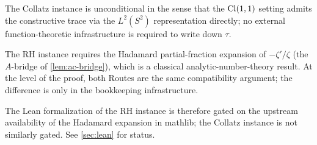 \begin{remark}
\label{rmk:collatz-unconditional}
The Collatz instance is unconditional in the sense that the
$\mathrm{Cl}(1,1)$ setting admits the constructive trace via the
$L^2(S^2)$ representation directly; no external function-theoretic
infrastructure is required to write down $\tau$.

The RH instance requires the Hadamard partial-fraction expansion
of $-\zeta'/\zeta$ (the $A$-bridge of \cref{lem:ac-bridge}), which
is a classical analytic-number-theory result.  At the level of
the proof, both Routes are the same compatibility argument; the
difference is only in the bookkeeping infrastructure.

The Lean formalization of the RH instance is therefore gated on
the upstream availability of the Hadamard expansion in mathlib;
the Collatz instance is not similarly gated.  See \cref{sec:lean}
for status.
\end{remark}


